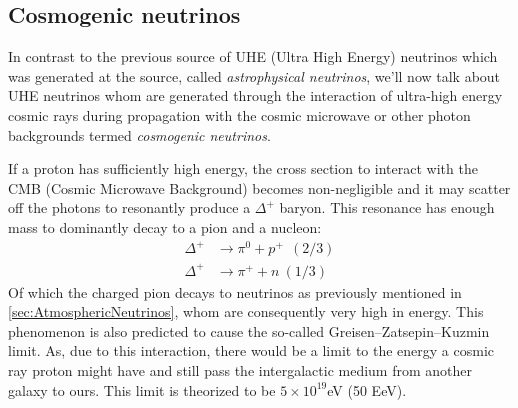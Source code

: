 \subsection{Cosmogenic neutrinos}
In contrast to the previous source of UHE (Ultra High Energy) neutrinos which
was generated at the source, called \textit{astrophysical neutrinos}, we'll now
talk about UHE neutrinos whom are generated through the interaction of
ultra-high energy cosmic rays during propagation with the cosmic microwave or
other photon backgrounds termed \textit{cosmogenic neutrinos}.  

If a proton has sufficiently high energy, the cross
section to interact with the CMB (Cosmic Microwave Background) becomes
non-negligible and it may scatter off the photons to
resonantly produce a $\Delta^+$ baryon.  This resonance has enough mass to
dominantly decay to a pion and a nucleon\cite{M_ller_2019}:
\begin{align}
	\Delta^+ &\rightarrow \pi^0 + p^+ \ \ (2/3)\\
	\Delta^+ &\rightarrow \pi^+ + n \ (1/3)
\end{align}
Of which the charged pion decays to neutrinos as previously mentioned in 
\ref{sec:AtmosphericNeutrinos}, whom are consequently very high in energy.
This phenomenon is also predicted to cause the so-called Greisen–Zatsepin–Kuzmin\cite{Zatsepin}\cite{Greisen} 
limit. As, due to this interaction, there would be a limit to the energy a cosmic ray proton might have
and still pass the intergalactic medium from another galaxy to ours. This limit is theorized to be
$5\times10^{19}$eV (50 EeV). 
